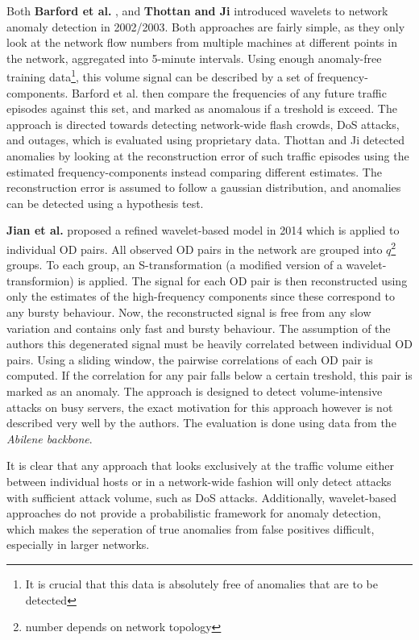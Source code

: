 \documentclass[a4paper,12pt,twoside]{report}
\begin{document}
Both \textbf{Barford et al.} \cite{barford2002signal}, and \textbf{Thottan and Ji} \cite{thottan2003anomaly} introduced wavelets to network anomaly detection in 2002/2003. Both approaches are fairly simple, as they only look at the network flow numbers from multiple machines at different points in the network, aggregated into 5-minute intervals. Using enough anomaly-free training data\footnote{It is crucial that this data is absolutely free of anomalies that are to be detected}, this volume signal can be described by a set of frequency-components. Barford et al. then compare the frequencies of any future traffic episodes against this set, and marked as anomalous if a treshold is exceed. The approach is directed towards detecting network-wide flash crowds, DoS attacks, and outages, which is evaluated using proprietary data. Thottan and Ji detected anomalies by looking at the reconstruction error of such traffic episodes using the estimated frequency-components instead comparing different estimates. The reconstruction error is assumed to follow a gaussian distribution, and anomalies can be detected using a hypothesis test.

\textbf{Jian et al.} \cite{jiang2014transform} proposed a refined wavelet-based model in 2014 which is applied to individual OD pairs. All observed OD pairs in the network are grouped into $q$\footnote{number depends on network topology} groups. To each group, an S-transformation (a modified version of a wavelet-transformion) is applied. The signal for each OD pair is then reconstructed using only the estimates of the high-frequency components since these correspond to any bursty behaviour. Now, the reconstructed signal is free from any slow variation and contains only fast and bursty behaviour. The assumption of the authors this degenerated signal must be heavily correlated between individual OD pairs. Using a sliding window, the pairwise correlations of each OD pair is computed. If the correlation for any pair falls below a certain treshold, this pair is marked as an anomaly. The approach is designed to detect volume-intensive attacks on busy servers, the exact motivation for this approach however is not described very well by the authors. The evaluation is done using data from the \textit{Abilene backbone}.

It is clear that any approach that looks exclusively at the traffic volume either between individual hosts or in a network-wide fashion will only detect attacks with sufficient attack volume, such as DoS attacks. Additionally, wavelet-based approaches do not provide a probabilistic framework for anomaly detection, which makes the seperation of true anomalies from false positives difficult, especially in larger networks. 
\end{document}
